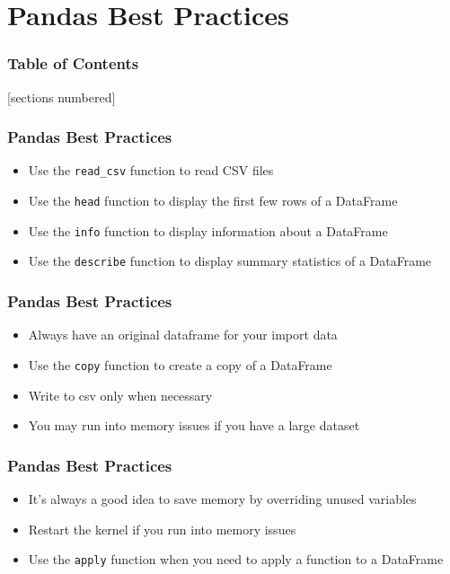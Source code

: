 \documentclass[serif, 9pt, aspectratio=32]{beamer}
\begin{document}
\section{Pandas Best Practices}

\begin{frame}
    \frametitle{Table of Contents}
    [sections numbered]
    \tableofcontents[currentsection]
\end{frame}

\begin{frame}
    \centering
    \frametitle{Pandas Best Practices}
    \begin{itemize}
        \setlength{\itemsep}{2em}
        \item Use the \texttt{read\_csv} function to read CSV files
        \item Use the \texttt{head} function to display the first few rows of a DataFrame
        \item Use the \texttt{info} function to display information about a DataFrame
        \item Use the \texttt{describe} function to display summary statistics of a DataFrame
    \end{itemize}
\end{frame}

\begin{frame}
    \centering
    \frametitle{Pandas Best Practices}
    \begin{itemize}
        \setlength{\itemsep}{2em}
        \item Always have an original dataframe for your import data
        \item Use the \texttt{copy} function to create a copy of a DataFrame
        \item Write to csv only when necessary
        \item You may run into memory issues if you have a large dataset
    \end{itemize}
\end{frame}

\begin{frame}
    \centering
    \frametitle{Pandas Best Practices}
    \begin{itemize}
        \setlength{\itemsep}{2em}
        \item It's always a good idea to save memory by overriding unused variables
        \item Restart the kernel if you run into memory issues
        \item Use the \texttt{apply} function when you need to apply a function to a DataFrame
    \end{itemize}
\end{frame}
\end{document}
